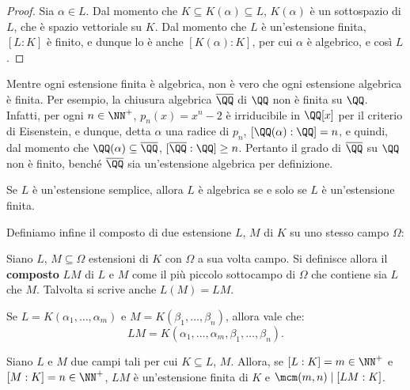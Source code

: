 \documentclass[12pt]{scrartcl}
\begin{document}
	\begin{proof}
		Sia $\alpha \in L$. Dal momento che $K \subseteq K(\alpha) \subseteq L$, $K(\alpha)$ è un sottospazio
		di $L$, che è spazio vettoriale su $K$. Dal momento
		che $L$ è un'estensione finita, $[L : K]$ è finito,
		e dunque lo è anche $[K(\alpha) : K]$, per cui
		$\alpha$ è algebrico, e così $L$.
	\end{proof}

	\begin{remark}
		Mentre ogni estensione finita è algebrica, non è
		vero che ogni estensione algebrica è finita. Per
		esempio,
		la chiusura algebrica $\overline{\QQ}$ di $\QQ$ non
		è finita su $\QQ$. Infatti, per ogni $n \in \NN^+$,
		$p_n(x) = x^n - 2$ è irriducibile in $\QQ[x]$ per il criterio
		di Eisenstein, e dunque, detta $\alpha$ una radice
		di $p_n$, $[\QQ(\alpha) : \QQ] = n$, e quindi, dal
		momento che $\QQ(\alpha) \subseteq \overline{\QQ}$,
		$[\overline{\QQ} : \QQ] \geq n$. Pertanto il grado
		di $\overline{\QQ}$ su $\QQ$ non è finito, benché
		$\overline{\QQ}$ sia un'estensione algebrica per
		definizione.
	\end{remark}

	\begin{remark}
		Se $L$ è un'estensione semplice, allora $L$
		è algebrica se e solo se $L$ è un'estensione
		finita.
	\end{remark}

	Definiamo infine il composto di due estensione $L$, $M$ di $K$ su uno stesso campo $\Omega$:

	\begin{definition}
		Siano $L$, $M \subseteq \Omega$ estensioni di $K$ con
		$\Omega$ a sua volta campo. Si definisce allora
		il \textbf{composto} $LM$ di $L$ e $M$ come il più
		piccolo sottocampo di $\Omega$ che contiene sia
		$L$ che $M$. Talvolta si scrive anche $L(M) = LM$.
	\end{definition}

	\begin{remark}
		Se $L = K(\alpha_1, \ldots, \alpha_m)$ e
		$M = K(\beta_1, \ldots, \beta_n)$, allora vale che:
		\[ LM = K(\alpha_1, \ldots, \alpha_m, \beta_1, \ldots, 
		\beta_n). \]
	\end{remark}

	\begin{proposition}
		Siano $L$ e $M$ due campi tali per cui
		$K \subseteq L$, $M$. Allora, se
		$[L : K] = m \in \NN^+$ e $[M : K] = n \in \NN^+$,
		$LM$ è un'estensione finita di $K$ e $\mcm(m, n) \mid [LM : K]$.
	\end{proposition}
\end{document}
